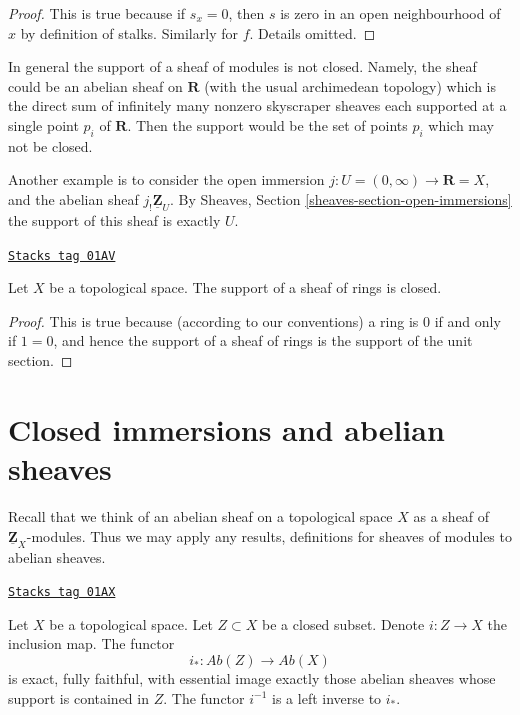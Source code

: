 \begin{proof}
This is true because if $s_x = 0$, then $s$ is zero
in an open neighbourhood of $x$ by definition of stalks.
Similarly for $f$. Details omitted.
\end{proof}

In general the support of a sheaf of modules is not closed.
Namely, the sheaf could be an abelian sheaf on $\mathbf{R}$
(with the usual archimedean topology)
which is the direct sum of infinitely many nonzero skyscraper
sheaves each supported at a single point $p_i$ of $\mathbf{R}$.
Then the support would be the set of points $p_i$
which may not be closed.

\medskip\noindent
Another example is to consider the open immersion
$j : U = (0 , \infty) \to \mathbf{R} = X$, and the abelian sheaf
$j_!\underline{\mathbf{Z}}_U$. By Sheaves, Section
\ref{sheaves-section-open-immersions} the support of
this sheaf is exactly $U$.

\begin{lemma}
\label{modules-lemma-support-sheaf-rings-closed}
\href{https://stacks.math.columbia.edu/tag/01AV}{\texttt{Stacks tag 01AV}}

Let $X$ be a topological space.
The support of a sheaf of rings is closed.
\end{lemma}

\begin{proof}
This is true because (according to our conventions)
a ring is $0$ if and only if
$1 = 0$, and hence the support of a sheaf of rings
is the support of the unit section.
\end{proof}

\section{Closed immersions and abelian sheaves}
\label{modules-section-closed-immersions}
Recall that we think of an abelian sheaf on a topological space $X$ as a
sheaf of $\underline{\mathbf{Z}}_X$-modules. Thus we may apply any results,
definitions for sheaves of modules to abelian sheaves.

\begin{lemma}
\label{modules-lemma-i-star-exact}
\href{https://stacks.math.columbia.edu/tag/01AX}{\texttt{Stacks tag 01AX}}

Let $X$ be a topological space. Let $Z \subset X$ be a closed subset.
Denote $i : Z \to X$ the inclusion map. The functor
$$
i_* : \textit{Ab}(Z) \longrightarrow \textit{Ab}(X)
$$
is exact, fully faithful, with essential image exactly those
abelian sheaves whose support is contained in $Z$. The functor $i^{-1}$
is a left inverse to $i_*$.
\end{lemma}

